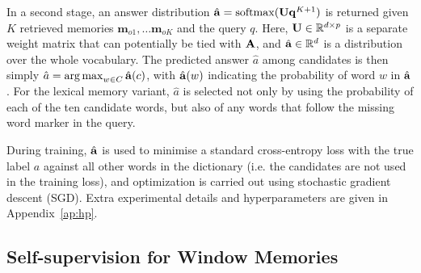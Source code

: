 
In a second stage, an answer distribution \(\hat{{\bf a}}=\operatorname*{softmax}( {\bf U} {\bf q}^{K+1})\) is returned given $K$ retrieved memories \( \textbf{m}_{o1}, \dots \textbf{m}_{oK} \) and the query \(q\).
%
Here, ${\bf U}\in\mathbb{R}^{d\times p}$ is a separate weight matrix that can potentially be tied with ${\bf A}$, and $\hat{{\bf a}}\in\mathbb{R}^d$ is a distribution over the whole vocabulary. The predicted answer $\hat{a}$ among candidates is then simply $\hat{a}=\operatorname*{arg\,max}_{w\in C}\hat{{\bf a}}(c)$, with $\hat{{\bf a}}(w)$ indicating the probability of word $w$ in $\hat{{\bf a}}$.
%
For the lexical memory variant, $\hat{a}$ is selected not only by using the probability of each of the ten candidate words, but also of any words that follow the missing word marker in the query.

During training, $\hat{{\bf a}}$  is used to minimise a standard cross-entropy loss with the true label $a$ against all other words in the dictionary (i.e. the candidates are not used in the training loss),  and optimization is carried out using stochastic gradient descent (SGD).
%
Extra experimental details and hyperparameters are given in Appendix~\ref{ap:hp}.



\subsection{Self-supervision for Window Memories} \label{sec:ssup}


